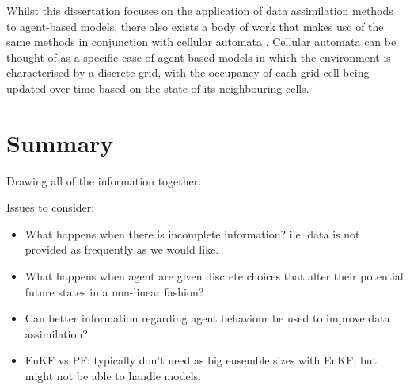 
Whilst this dissertation focuses on the application of data assimilation methods
to agent-based models, there also exists a body of work that makes use of the
same methods in conjunction with cellular automata \citep{li2012assimilating,
li2017exploring}.
Cellular automata can be thought of as a specific case of agent-based models in
which the environment is characterised by a discrete grid, with the occupancy of
each grid cell being updated over time based on the state of its neighbouring
cells.



\section{Summary}\label{sec:lit_rev:summary}

Drawing all of the information together.

Issues to consider:
\begin{itemize}
    \item What happens when there is incomplete information? i.e. data is not
        provided as frequently as we would like.
    \item What happens when agent are given discrete choices that alter their
        potential future states in a non-linear fashion?
    \item Can better information regarding agent behaviour be used to improve
        data assimilation?
    \item EnKF vs PF: typically don't need as big ensemble sizes with EnKF, but
        might not be able to handle models.
\end{itemize}
